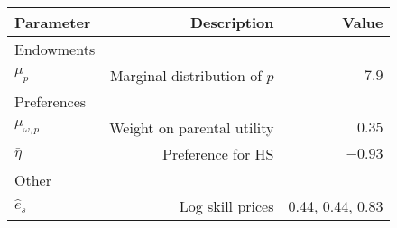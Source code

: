 \begin{tabular}{lrr}
\hline
Parameter & Description  & Value  \\
\hline
Endowments &   &   \\
$\mu_{p}$ & Marginal distribution of $p$  & $7.9$  \\
Preferences &   &   \\
$\mu_{\omega,p}$ & Weight on parental utility  & $0.35$  \\
$\bar{\eta}$ & Preference for HS  & $-0.93$  \\
Other &   &   \\
$\hat{e}_{s}$ & Log skill prices  & 0.44, 0.44, 0.83  \\
\hline
\end{tabular}%
